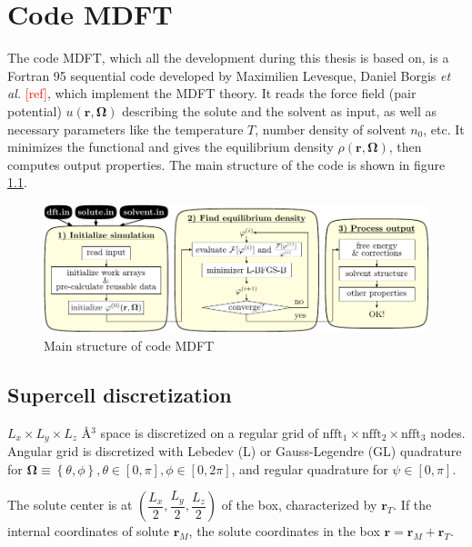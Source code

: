 
\chapter{Code MDFT\label{chpt:mdft}}

The code MDFT, which all the development during this thesis is based
on, is a Fortran 95 sequential code developed by Maximilien Levesque,
Daniel Borgis \textit{et al.} \textcolor{red}{{[}ref{]}}, which implement
the \acs{MDFT} theory. It reads the force field (pair potential)
$u(\mathbf{r},\mathbf{\Omega})$ describing the solute and the solvent
as input, as well as necessary parameters like the temperature $T$,
number density of solvent $n_{0}$, etc. It minimizes the functional
and gives the equilibrium density $\rho(\mathbf{r},\mathbf{\Omega})$,
then computes output properties. The main structure of the code is
shown in figure \ref{fig:code-mdft}.

\begin{figure}[h]
\begin{centering}
\includegraphics[width=1\columnwidth]{_figure/mdft}
\par\end{centering}
\caption{Main structure of code MDFT\label{fig:code-mdft}}
\end{figure}


\section{Supercell discretization}

$L_{x}\times L_{y}\times L_{z}$ Å$^{3}$ space is discretized on
a regular grid of $\textrm{nfft}_{1}\times\textrm{nfft}_{2}\times\textrm{nfft}_{3}$
nodes. Angular grid is discretized with Lebedev (L) or Gauss-Legendre
(GL) quadrature for $\bm{\Omega}\equiv\left\{ \theta,\phi\right\} ,\theta\in\left[0,\pi\right],\phi\in\left[0,2\pi\right]$,
and regular quadrature for $\psi\in\left[0,\pi\right]$.

The solute center is at $\left(\dfrac{L_{x}}{2},\dfrac{L_{y}}{2},\dfrac{L_{z}}{2}\right)$
of the box, characterized by $\mathbf{r}_{T}$. If the internal coordinates
of solute $\mathbf{r}_{M}$, the solute coordinates in the box $\mathbf{r}=\mathbf{r}_{M}+\mathbf{r}_{T}$.

